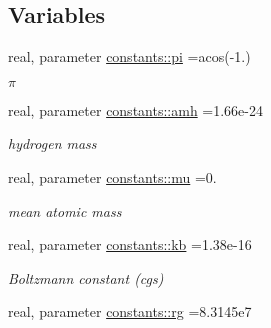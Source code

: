 \subsection*{Variables}
\begin{DoxyCompactItemize}
\item 
\hypertarget{namespaceconstants_a815ad954ef712211ed1b1fdb8be42487}{}real, parameter \hyperlink{namespaceconstants_a815ad954ef712211ed1b1fdb8be42487}{constants\+::pi} =acos(-\/1.)\label{namespaceconstants_a815ad954ef712211ed1b1fdb8be42487}

\begin{DoxyCompactList}\small\item\em $ \pi $ \end{DoxyCompactList}\item 
\hypertarget{namespaceconstants_aac258d92ad409a5ad7f8748101e932b0}{}real, parameter \hyperlink{namespaceconstants_aac258d92ad409a5ad7f8748101e932b0}{constants\+::amh} =1.\+66e-\/24\label{namespaceconstants_aac258d92ad409a5ad7f8748101e932b0}

\begin{DoxyCompactList}\small\item\em hydrogen mass \end{DoxyCompactList}\item 
\hypertarget{namespaceconstants_a02d6877af0064a592565cca791e6dfa2}{}real, parameter \hyperlink{namespaceconstants_a02d6877af0064a592565cca791e6dfa2}{constants\+::mu} =0.\label{namespaceconstants_a02d6877af0064a592565cca791e6dfa2}

\begin{DoxyCompactList}\small\item\em mean atomic mass \end{DoxyCompactList}\item 
\hypertarget{namespaceconstants_afc7b29a52df069e705256c11de562808}{}real, parameter \hyperlink{namespaceconstants_afc7b29a52df069e705256c11de562808}{constants\+::kb} =1.\+38e-\/16\label{namespaceconstants_afc7b29a52df069e705256c11de562808}

\begin{DoxyCompactList}\small\item\em Boltzmann constant (cgs) \end{DoxyCompactList}\item 
\hypertarget{namespaceconstants_aab4c0a2b0e8b8cda79e9d683b3e650f6}{}real, parameter \hyperlink{namespaceconstants_aab4c0a2b0e8b8cda79e9d683b3e650f6}{constants\+::rg} =8.\+3145e7\label{namespaceconstants_aab4c0a2b0e8b8cda79e9d683b3e650f6}


\end{DoxyCompactItemize}
